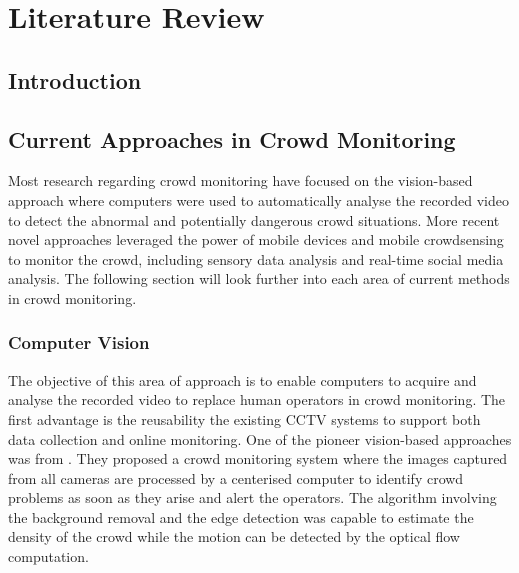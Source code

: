 \chapter{Literature Review}
\label{ch:litReview}
\ifpdf
    \graphicspath{{Chapter2/Figs/Raster/}{Chapter2/Figs/PDF/}{Chapter2/Figs/}}
\else
    \graphicspath{{Chapter2/Figs/Vector/}{Chapter2/Figs/}}
\fi

\section{Introduction}

\section{Current Approaches in Crowd Monitoring}
Most research regarding crowd monitoring have focused on the vision-based approach where computers were used to automatically analyse the recorded video to detect the abnormal and potentially dangerous crowd situations. More recent novel approaches leveraged the power of mobile devices and mobile crowdsensing to monitor the crowd, including sensory data analysis and real-time social media analysis. The following section will look further into each area of current methods in crowd monitoring. 

\subsection{Computer Vision}
The objective of this area of approach is to enable computers to acquire and analyse the recorded video to replace human operators in crowd monitoring. The first advantage is the reusability the existing CCTV systems to support both data collection and online monitoring. One of the pioneer vision-based approaches was from \citet{Davies1995}. They proposed a crowd monitoring system where the images captured from all cameras are processed by a centerised computer to identify crowd problems as soon as they arise and alert the operators. The algorithm involving the background removal and the edge detection was capable to estimate the density of the crowd while the motion can be detected by the optical flow computation.

